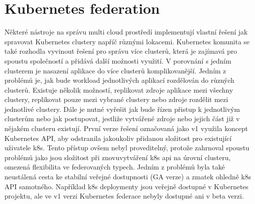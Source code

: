 \section{Kubernetes federation}
Některé nástroje na správu multi cloud prostředí implementují vlastní řešení jak spravovat Kubernetes clustery napříč různými lokacemi. Kubernetes komunita se také \linebreak rozhodla vyvinout řešení pro správu více clusterů, která je zajímavá pro spoustu \linebreak společností a přidává další možnosti využití. V porovnání s jedním clusterem je \linebreak nasazení aplikace do více clusterů komplikovanější. Jedním z problémů je, jak bude workload jednotlivých aplikací rozdělován do různých clusterů. Existuje několik \linebreak možností, replikovat zdroje aplikace mezi všechny clustery, replikovat pouze mezi vybrané clustery nebo zdroje rozdělit mezi jednotlivé clustery. Dále je nutné vyřešit jak bude řízen přistup k jednotlivým clusterům nebo jak postupovat, jestliže vytvářené zdroje nebo jejich část již v nějakém clusteru existují. První verze řešení označovaná jako v1 využila koncept Kubernetes API, aby odstranila jakoukoliv přidanou složitost pro existující uživatele k8s. Tento přístup ovšem nebyl proveditelný, protože zahrnoval spoustu problémů jako jsou složitost při znovuvytváření k8s api na úrovní clusteru, omezená flexibilita ve federovaných typech. Jedním z problémů byla také neustálená cesta ke stabilní veřejné dostupnosti (GA verze) a zmatek ohledně k8s API samotného. Například k8s deploymenty jsou veřejně dostupné v Kubernetes projektu, ale ve v1 verzi Kubernetes federace nebyly dostupné ani v beta verzi. \par
